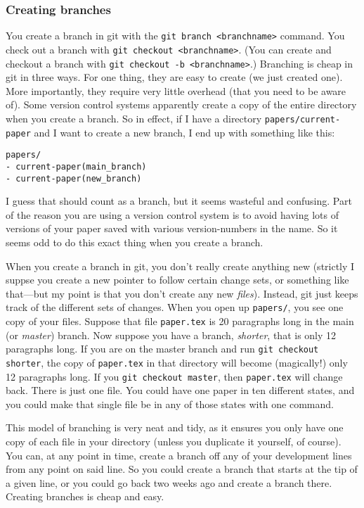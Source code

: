 \documentclass{article}
\begin{document}
\subsubsection{Creating branches}

You create a branch in git with the \verb!git branch <branchname>!
command. You check out a branch with
\verb!git checkout <branchname>!. (You can create and checkout a
branch with \verb!git checkout -b <branchname>!.) Branching is
cheap in git in three ways. For one thing, they are easy to create
(we just created one). More importantly, they require very little
overhead (that you need to be aware of). Some version control
systems apparently create a copy of the entire directory when you
create a branch. So in effect, if I have a directory
\verb!papers/current-paper! and I want to create a new branch, I
end up with something like this:

\begin{verbatim}
papers/
- current-paper(main_branch)
- current-paper(new_branch)
\end{verbatim}
I guess that should count as a branch, but it seems wasteful and
confusing. Part of the reason you are using a version control
system is to avoid having lots of versions of your paper saved with
various version-numbers in the name. So it seems odd to do this
exact thing when you create a branch.

When you create a branch in git, you don't really create anything
new (strictly I suppse you create a new pointer to follow certain
change sets, or something like that—but my point is that you don't
create any new \emph{files}). Instead, git just keeps track of the
different sets of changes. When you open up \verb!papers/!, you see
one copy of your files. Suppose that file \verb!paper.tex! is 20
paragraphs long in the main (or \emph{master}) branch. Now suppose
you have a branch, \emph{shorter}, that is only 12 paragraphs long.
If you are on the master branch and run
\verb!git checkout shorter!, the copy of \verb!paper.tex! in that
directory will become (magically!) only 12 paragraphs long. If you
\verb!git checkout master!, then \verb!paper.tex! will change back.
There is just one file. You could have one paper in ten different
states, and you could make that single file be in any of those
states with one command.

This model of branching is very neat and tidy, as it ensures you
only have one copy of each file in your directory (unless you
duplicate it yourself, of course). You can, at any point in time,
create a branch off any of your development lines from any point on
said line. So you could create a branch that starts at the tip of a
given line, or you could go back two weeks ago and create a branch
there. Creating branches is cheap and easy.
\end{document}
